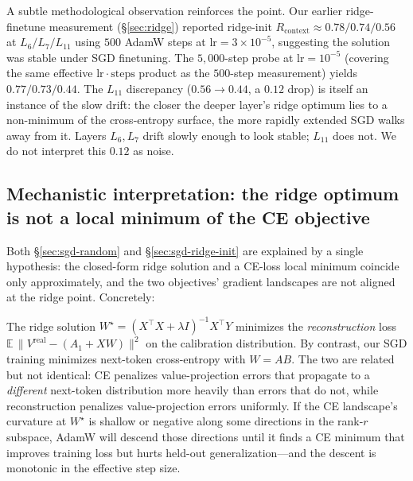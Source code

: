 A subtle methodological observation reinforces the point. Our earlier
ridge-finetune measurement (\S\ref{sec:ridge}) reported ridge-init
$R_\mathrm{context} \approx 0.78/0.74/0.56$ at $L_6/L_7/L_{11}$ using
$500$ AdamW steps at $\mathrm{lr}{=}3{\times}10^{-5}$, suggesting the
solution was stable under SGD finetuning. The $5{,}000$-step probe at
$\mathrm{lr}{=}10^{-5}$ (covering the same effective $\mathrm{lr}\!\cdot\!
\mathrm{steps}$ product as the $500$-step measurement) yields
$0.77/0.73/0.44$. The $L_{11}$ discrepancy ($0.56 \to 0.44$, a $0.12$ drop)
is itself an instance of the slow drift: the closer the deeper layer's
ridge optimum lies to a non-minimum of the cross-entropy surface, the
more rapidly extended SGD walks away from it. Layers $L_6, L_7$ drift
slowly enough to look stable; $L_{11}$ does not. We do not interpret this
$0.12$ as noise.

\subsection{Mechanistic interpretation: the ridge optimum is not a local
minimum of the CE objective}
\label{sec:sgd-mechanism}

Both \S\ref{sec:sgd-random} and \S\ref{sec:sgd-ridge-init} are explained by
a single hypothesis: the closed-form ridge solution and a CE-loss local
minimum coincide only approximately, and the two objectives' gradient
landscapes are not aligned at the ridge point. Concretely:

The ridge solution
$W^\star = (X^\top X + \lambda I)^{-1} X^\top Y$ minimizes the
\emph{reconstruction} loss
$\mathbb{E}\,\|V^\mathrm{real} - (A_1 + X W)\|^2$
on the calibration distribution. By contrast, our SGD training minimizes
next-token cross-entropy with $W = AB$. The two are related but not
identical: CE penalizes value-projection errors that propagate to a
\emph{different} next-token distribution more heavily than errors that do
not, while reconstruction penalizes value-projection errors uniformly. If
the CE landscape's curvature at $W^\star$ is shallow or negative along
some directions in the rank-$r$ subspace, AdamW will descend those
directions until it finds a CE minimum that improves training loss but
hurts held-out generalization---and the descent is monotonic in the
effective step size.

